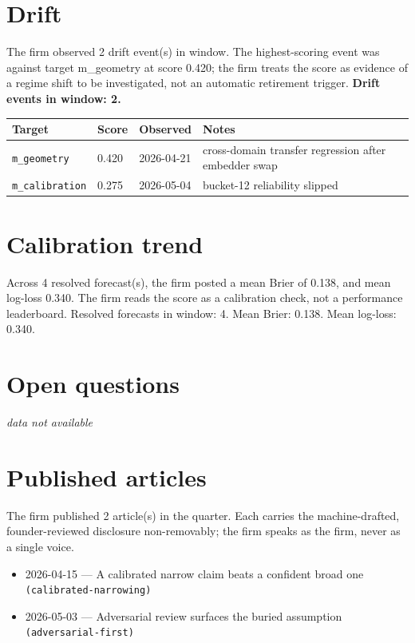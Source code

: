 \documentclass[11pt,letterpaper]{article}
\newcommand{\datagap}[1]{\textcolor{black!55}{\emph{#1}}}
\begin{document}
\section{Drift}
The firm observed 2 drift event(s) in window. The highest-scoring event was against target m\_geometry at score 0.420; the firm treats the score as evidence of a regime shift to be investigated, not an automatic retirement trigger.
\textbf{Drift events in window: 2.}

\begin{center}
\begin{tabular}{@{}p{} p{} p{} p{}@{}}
\toprule
\textbf{Target} & \textbf{Score} & \textbf{Observed} & \textbf{Notes} \\
\midrule
\texttt{m\_geometry} & 0.420 & 2026-04-21 & cross-domain transfer regression after embedder swap \\
\texttt{m\_calibration} & 0.275 & 2026-05-04 & bucket-12 reliability slipped \\
\bottomrule
\end{tabular}
\end{center}
\section{Calibration trend}
Across 4 resolved forecast(s), the firm posted a mean Brier of 0.138, and mean log-loss 0.340. The firm reads the score as a calibration check, not a performance leaderboard.
Resolved forecasts in window: 4.
Mean Brier: 0.138.
Mean log-loss: 0.340.
\section{Open questions}
\datagap{data not available}
\section{Published articles}
The firm published 2 article(s) in the quarter. Each carries the machine-drafted, founder-reviewed disclosure non-removably; the firm speaks as the firm, never as a single voice.
\begin{itemize}[leftmargin=1.5em]
  \item 2026-04-15 --- A calibrated narrow claim beats a confident broad one \texttt{(calibrated-narrowing)}
  \item 2026-05-03 --- Adversarial review surfaces the buried assumption \texttt{(adversarial-first)}
\end{itemize}
\end{document}
